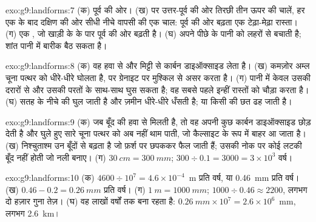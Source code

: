 \begin{solution}{exo:g9:landforms:7}
(क) पूर्व की ओर। (ख)  पर उत्तर-पूर्व की ओर तिरछी तीन ऊपर की चालें, हर एक के बाद
दक्षिण की ओर सीधी नीचे वापसी की एक चाल: पूर्व की ओर बढ़ता एक टेढ़ा-मेढ़ा रास्ता। (ग) एक
, जो खाड़ी के  के पार पूर्व की ओर बढ़ती है। (घ)  अपने पीछे के पानी
को लहरों से बचाती है; शांत पानी में बारीक  बैठ सकता
है।
\end{solution}

\begin{solution}{exo:g9:landforms:8}
(क) वह हवा से और मिट्टी से कार्बन डाइऑक्साइड लेता है। (ख) कमज़ोर अम्ल चूना पत्थर
को धीरे-धीरे घोलता है, पर ग्रेनाइट पर मुश्किल से असर करता है। (ग) पानी  में केवल
उसकी दरारों से और उसकी परतों के साथ-साथ घुस सकता है; वह सबसे पहले इन्हीं रास्तों को चौड़ा
करता है। (घ) सतह के नीचे की  घुल जाती है और ज़मीन धीरे-धीरे धँसती है; या किसी 
की छत ढह जाती है।
\end{solution}

\begin{solution}{exo:g9:landforms:9}
(क) जब बूँद  की हवा से मिलती है, तो वह अपनी कुछ कार्बन डाइऑक्साइड छोड़ देती है और
घुले हुए सारे चूना पत्थर को अब नहीं थाम पाती, जो कैल्साइट के रूप में बाहर आ जाता है।
(ख) निश्चुताश्म उन बूँदों से बढ़ता है जो फ़र्श पर छपककर फैल जाती हैं; उसकी नोक पर कोई
लटकी बूँद नहीं होती जो नली बनाए।
(ग) $\qty{30}{cm} = \qty{300}{mm}$; $300 \div 0.1 = 3000 = 3 \times 10^3$
वर्ष।
\end{solution}

\begin{solution}{exo:g9:landforms:10}
(क) $4600 \div 10^7 = 4.6 \times 10^{-4}$~m प्रति वर्ष, या \qty{0.46}{mm} प्रति
वर्ष। (ख) $0.46 - 0.2 = \qty{0.26}{mm}$ प्रति वर्ष। (ग) $\qty{1}{m} =
\qty{1000}{mm}$; $1000 \div 0.46 \approx 2200$, लगभग दो हज़ार गुना
तेज़। (घ) वह लाखों वर्षों तक बना रहता है: $\qty{0.26}{mm} \times
10^7 = 2.6 \times 10^6$~mm, लगभग \qty{2.6}{km}।
\end{solution}

